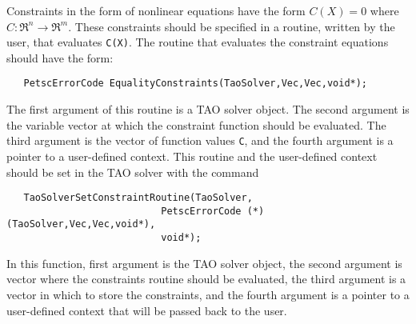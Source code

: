 Constraints in the form of nonlinear equations have the form
$C(X) = 0$ where $C: \Re^n \to \Re^m$.
These constraints should be specified in a 
routine, written by the user, that evaluates {\tt C(X)}.
The routine that evaluates the constraint equations should have the form:
\begin{verbatim}
   PetscErrorCode EqualityConstraints(TaoSolver,Vec,Vec,void*);
\end{verbatim}
\noindent
The first argument of this routine is a TAO solver object.  The second argument
is the variable vector at which the constraint function should be evaluated.  
The third argument is the vector of function values {\tt C}, and the fourth
argument is a pointer to a user-defined context.
This routine  and the user-defined context 
should be set in the TAO solver with the command
\begin{verbatim}
   TaoSolverSetConstraintRoutine(TaoSolver,
                           PetscErrorCode (*)(TaoSolver,Vec,Vec,void*),
                           void*);
\end{verbatim}
\noindent
In this function, first argument is the TAO solver object,
the second argument is vector where the constraints routine should be
evaluated, the third argument is a vector in which to store the constraints,
and the fourth argument is a pointer to a user-defined context that will
be passed back to the user.

